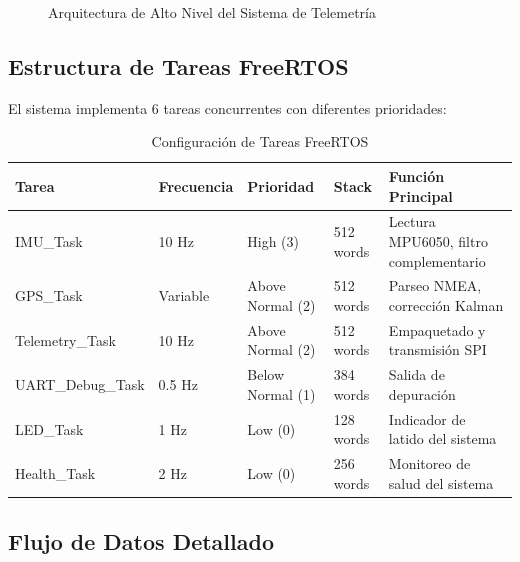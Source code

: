 \documentclass[11pt,a4paper]{article}
\begin{document}
\begin{figure}[H]
\caption{Arquitectura de Alto Nivel del Sistema de Telemetría}
\end{figure}

\subsection{Estructura de Tareas FreeRTOS}

El sistema implementa 6 tareas concurrentes con diferentes prioridades:

\begin{table}[H]
\centering
\begin{tabular}{@{}lllll@{}}
\toprule
\textbf{Tarea} & \textbf{Frecuencia} & \textbf{Prioridad} & \textbf{Stack} & \textbf{Función Principal} \\
\midrule
IMU\_Task & 10 Hz & High (3) & 512 words & Lectura MPU6050, filtro complementario \\
GPS\_Task & Variable & Above Normal (2) & 512 words & Parseo NMEA, corrección Kalman \\
Telemetry\_Task & 10 Hz & Above Normal (2) & 512 words & Empaquetado y transmisión SPI \\
UART\_Debug\_Task & 0.5 Hz & Below Normal (1) & 384 words & Salida de depuración \\
LED\_Task & 1 Hz & Low (0) & 128 words & Indicador de latido del sistema \\
Health\_Task & 2 Hz & Low (0) & 256 words & Monitoreo de salud del sistema \\
\bottomrule
\end{tabular}
\caption{Configuración de Tareas FreeRTOS}
\end{table}

\subsection{Flujo de Datos Detallado}
\end{document}
